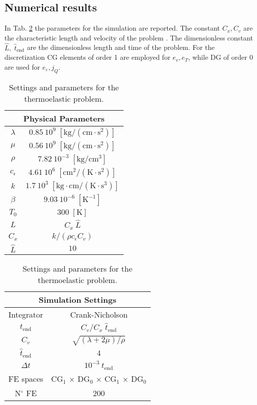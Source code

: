 \subsection{Numerical results}
In Tab. \ref{tab:parTherElas} the parameters for the simulation are reported. The constant $C_x, C_v$ are the characteristic length and velocity of the problem \cite{rabizadeh2016}. The dimensionless constant $\widehat{L}, \; \widehat{t}_{\text{end}}$ are the dimensionless length and time of the problem. For the discretization  CG elements of order 1 are employed for $e_v, e_T$, while DG of order 0 are used for $e_\varepsilon, j_Q$. 

\begin{table}[htb]
	\centering
	\begin{tabular}{|c|c|}
		\hline 
		\multicolumn{2}{|c|}{Physical Parameters} \\
		\hline 	
		$\lambda$ & $0.85\ 10^9 \; [\mathrm{kg/(cm\cdot s^2)}]$ \\ 
		$\mu$ & $0.56\ 10^9 \; [\mathrm{kg/(cm\cdot s^2)}]$ \\
		$\rho$ & $7.82\ 10^{-3} \; [\mathrm{kg}/\textrm{cm}^3]$ \\ 
		$c_\epsilon$ & $4.61\ 10^6 \; [\mathrm{cm^2/(K\cdot s^2)}]$ \\
		$k$ & $1.7\ 10^3 \; [\mathrm{kg \cdot cm/ (K\cdot s^3)}]$ \\ 
		$\beta$ & $9.03\ 10^{-6} \; [\mathrm{K}^{-1}]$ \\ 
		$T_0$ & $300 \; [\mathrm{K}]$ \\ 
		$L$ & $C_x \ \widehat{L}$ \\
		$C_x$ & ${k}/{(\rho c_\epsilon C_v)}$ \\
		$\widehat{L}$ & $10$ \\
		\hline 
	\end{tabular} \hspace{.5cm}
	\begin{tabular}{|c|c|}
		\hline 
		\multicolumn{2}{|c|}{Simulation Settings} \\ 
		\hline 
		Integrator & Crank-Nicholson\\
		$t_{\text{end}}$& ${C_v}/{C_x} \; \widehat{t}_{\text{end}}$ \\ 
		$C_v$ & $\sqrt{(\lambda + 2 \mu) / \rho}$ \\
		$\widehat{t}_{\text{end}}$ & $4$ \\
		$\Delta t$ & $10^{-3} \ t_{\text{end}}$ \\
		FE spaces& CG$_1$ $\times$ DG$_0$ $\times$ CG$_1$ $\times$ DG$_0$ \\
		N$^\circ$ FE & 200 \\
		\hline 
	\end{tabular} 
	\vspace{1mm}
	\caption{Settings and parameters for the thermoelastic problem.}
	\label{tab:parTherElas}
\end{table}


